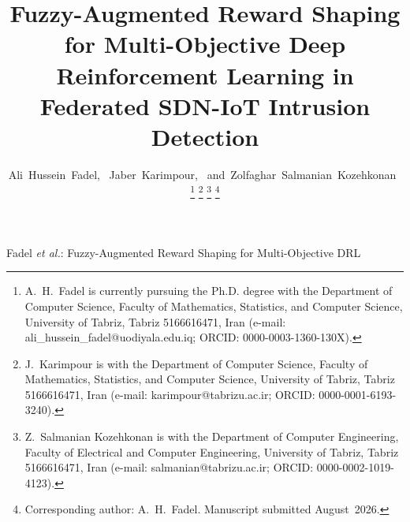 \documentclass[journal]{IEEEtran}
\begin{document}
\title{Fuzzy-Augmented Reward Shaping for Multi-Objective Deep Reinforcement Learning in Federated SDN-IoT Intrusion Detection}

\author{Ali~Hussein~Fadel,~\IEEEmembership{}
        Jaber~Karimpour,~\IEEEmembership{}
        and~Zolfaghar~Salmanian~Kozehkonan~\IEEEmembership{}%
\thanks{A.~H.~Fadel is currently pursuing the Ph.D. degree with the Department of Computer Science, Faculty of Mathematics, Statistics, and Computer Science, University of Tabriz, Tabriz 5166616471, Iran (e-mail: ali\_hussein\_fadel@uodiyala.edu.iq; ORCID: 0000-0003-1360-130X).}%
\thanks{J.~Karimpour is with the Department of Computer Science, Faculty of Mathematics, Statistics, and Computer Science, University of Tabriz, Tabriz 5166616471, Iran (e-mail: karimpour@tabrizu.ac.ir; ORCID: 0000-0001-6193-3240).}%
\thanks{Z.~Salmanian Kozehkonan is with the Department of Computer Engineering, Faculty of Electrical and Computer Engineering, University of Tabriz, Tabriz 5166616471, Iran (e-mail: salmanian@tabrizu.ac.ir; ORCID: 0000-0002-1019-4123).}%
\thanks{Corresponding author: A.~H.~Fadel. Manuscript submitted August~2026.}}

%
{Fadel \MakeLowercase{\textit{et al.}}: Fuzzy-Augmented Reward Shaping for Multi-Objective DRL}

\maketitle
\end{document}
